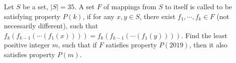 Let $S$ be a set, $|S|=35$. A set $F$ of mappings from $S$ to itself is called to be satisfying property $P(k)$, if for any $x,y\in S$, there exist $f_1, \cdots, f_k \in F$ (not necessarily different), such that $f_k(f_{k-1}(\cdots (f_1(x))))=f_k(f_{k-1}(\cdots (f_1(y))))$.
Find the least positive integer $m$, such that if $F$ satisfies property $P(2019)$, then it also satisfies property $P(m)$.